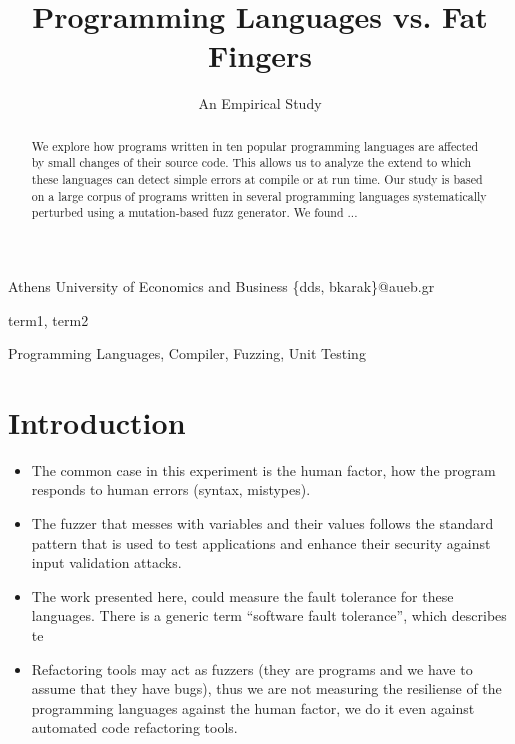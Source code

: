 \documentclass[10pt]{sigplanconf}
\begin{document}
\copyrightdata{[to be supplied]}


\title{Programming Languages vs. Fat Fingers}
\subtitle{An Empirical Study}

           {Athens University of Economics and Business}
           {\{dds, bkarak\}@aueb.gr}

\maketitle

\begin{abstract}
We explore how programs written in ten popular programming languages
are affected by small changes of their source code.
This allows us to analyze the extend to which these languages
can detect simple errors at compile or at run time.
Our study is based on a large corpus of programs written in several programming
languages systematically perturbed using a mutation-based fuzz generator.
We found ... %
\end{abstract}


\terms
term1, term2

\keywords
Programming Languages, Compiler, Fuzzing, Unit Testing

\section{Introduction} %

\cite{C99}

\begin{itemize}
	\item The common case in this experiment is the human factor, how the program responds to human errors (syntax, mistypes).
	\item The fuzzer that messes with variables and their values follows the standard pattern that is used to test applications and enhance their security against input validation attacks.
	\item The work presented here, could measure the fault tolerance for these languages. There is a generic term ``software fault tolerance'', which describes te
	\item Refactoring tools may act as fuzzers (they are programs and we have to assume that they have bugs), thus we are not measuring the resiliense of the programming languages against the human factor, we do it even against automated code refactoring tools.
\end{itemize}
\end{document}
